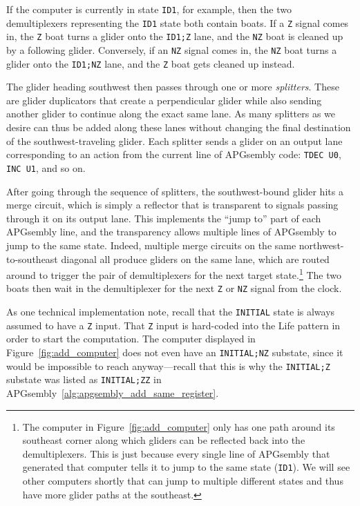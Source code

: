 If the computer is currently in state \texttt{ID1}, for example, then the two demultiplexers representing the \texttt{ID1} state both contain boats. If a \texttt{Z} signal comes in, the \texttt{Z} boat turns a glider onto the \texttt{ID1;Z} lane, and the \texttt{NZ} boat is cleaned up by a following glider. Conversely, if an \texttt{NZ} signal comes in, the \texttt{NZ} boat turns a glider onto the \texttt{ID1;NZ} lane, and the \texttt{Z} boat gets cleaned up instead.

The glider heading southwest then passes through one or more \emph{splitters}. These are glider duplicators that create a perpendicular glider while also sending another glider to continue along the exact same lane. As many splitters as we desire can thus be added along these lanes without changing the final destination of the southwest-traveling glider. Each splitter sends a glider on an output lane corresponding to an action from the current line of APGsembly code: \texttt{TDEC U0}, \texttt{INC U1}, and so on.

After going through the sequence of splitters, the southwest-bound glider hits a merge circuit, which is simply a reflector that is transparent to signals passing through it on its output lane. This implements the ``jump to'' part of each APGsembly line, and the transparency allows multiple lines of APGsembly to jump to the same state. Indeed, multiple merge circuits on the same northwest-to-southeast diagonal all produce gliders on the same lane, which are routed around to trigger the pair of demultiplexers for the next target state.\footnote{The computer in Figure~\ref{fig:add_computer} only has one path around its southeast corner along which gliders can be reflected back into the demultiplexers. This is just because every single line of APGsembly that generated that computer tells it to jump to the same state (\texttt{ID1}). We will see other computers shortly that can jump to multiple different states and thus have more glider paths at the southeast.} The two boats then wait in the demultiplexer for the next \texttt{Z} or \texttt{NZ} signal from the clock.

As one technical implementation note, recall that the \texttt{INITIAL} state is always assumed to have a \texttt{Z} input. That \texttt{Z} input is hard-coded into the Life pattern in order to start the computation. The computer displayed in Figure~\ref{fig:add_computer} does not even have an \texttt{INITIAL;NZ} substate, since it would be impossible to reach anyway---recall that this is why the \texttt{INITIAL;Z} substate was listed as \texttt{INITIAL;ZZ} in APGsembly~\ref{alg:apgsembly_add_same_register}.


